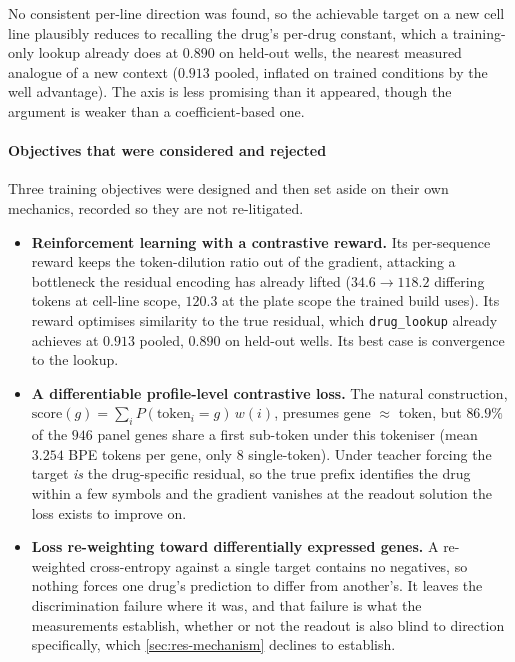 No consistent per-line direction was found, so the achievable target on a new
cell line plausibly reduces to recalling the drug's per-drug constant, which a
training-only lookup already does at $0.890$ on held-out wells, the nearest
measured analogue of a new context ($0.913$ pooled, inflated on trained
conditions by the well advantage). The axis is less promising than it appeared,
though the argument is weaker than a coefficient-based one.

\paragraph{Objectives that were considered and rejected} Three training
objectives were designed and then set aside on their own mechanics, recorded so
they are not re-litigated.
\begin{itemize}
  \item \textbf{Reinforcement learning with a contrastive reward.} Its
        per-sequence reward keeps the token-dilution ratio out of the gradient,
        attacking a bottleneck the residual encoding has already lifted ($34.6
        \rightarrow 118.2$ differing tokens at cell-line scope, $120.3$ at the
        plate scope the trained build uses). Its reward optimises similarity to
        the true residual, which \texttt{drug\_lookup} already achieves at
        $0.913$ pooled, $0.890$ on held-out wells. Its best case is convergence
        to the lookup.
  \item \textbf{A differentiable profile-level contrastive loss.} The natural
        construction, $\textrm{score}(g) = \sum_i P(\textrm{token}_i =
        g)\,w(i)$, presumes gene $\approx$ token, but $86.9\%$ of the $\num{946}$
        panel genes share a first sub-token under this tokeniser (mean $3.254$
        BPE tokens per gene, only $8$ single-token). Under teacher forcing the
        target \emph{is} the drug-specific residual, so the true prefix
        identifies the drug within a few symbols and the gradient vanishes at
        the readout solution the loss exists to improve on.
  \item \textbf{Loss re-weighting toward differentially expressed genes.}
        A re-weighted cross-entropy against a single target contains no
        negatives, so nothing forces one drug's prediction to differ from
        another's. It leaves the discrimination failure where it was, and that
        failure is
        what the measurements establish, whether or not the readout is also
        blind to direction specifically, which \cref{sec:res-mechanism} declines
        to establish.
\end{itemize}

